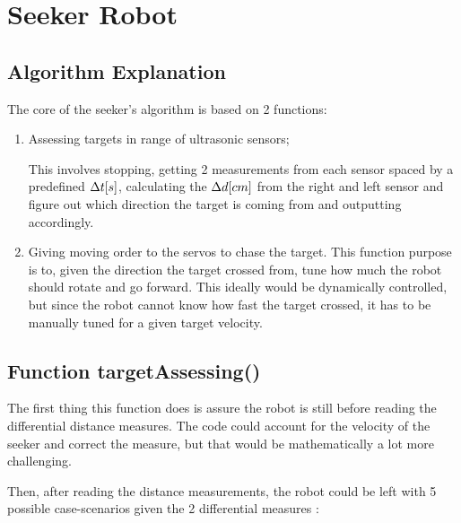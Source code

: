 \documentclass[sigconf,nonacm]{acmart}
\begin{document}
\section{Seeker Robot}


\subsection{Algorithm Explanation}

The core of the seeker's algorithm is based on 2 functions:
\begin{enumerate}
      \item Assessing targets in range of ultrasonic sensors;
      
      This involves stopping, getting 2 measurements from each sensor spaced by
      a predefined $\Delta t\space[s]$, calculating the $\Delta d\space[cm]$ from the right and
      left sensor and figure out which direction the target is coming from and
      outputting accordingly.
      \item Giving moving order to the servos to chase the target. This function
      purpose is to, given the direction the target crossed from, tune how much
      the robot should rotate and go forward. This ideally would be dynamically
      controlled, but since the robot cannot know how fast the target crossed,
      it has to be manually tuned for a given target velocity.
\end{enumerate}

\subsection{Function targetAssessing()}

The first thing this function does is assure the robot is still before reading
the differential distance measures. The code could account for the velocity of
the seeker and correct the measure, but that would be mathematically a lot more
challenging.

Then, after reading the distance measurements, the robot could be left with 5
possible case-scenarios given the 2 differential measures :
\end{document}
